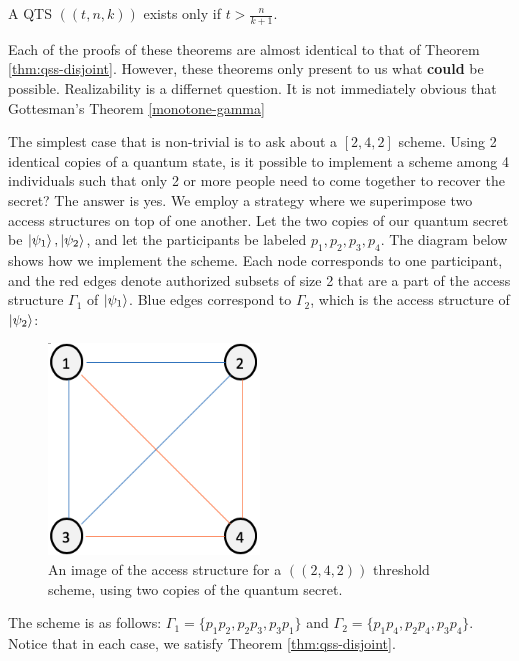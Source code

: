 \begin{theorem}
	\label{qtsk}
	A QTS $((t,n, k))$ exists only if $t > \frac{n}{k+1}$.
\end{theorem}

Each of the proofs of these theorems are almost identical to that of Theorem \ref{thm:qss-disjoint}. However, these theorems only present to us what \textbf{could} be possible. Realizability is a differnet question. It is not immediately obvious that Gottesman's Theorem \ref{monotone-gamma}

The simplest case that is non-trivial is to ask about a $[2,4,2]$ scheme. Using 2 identical copies of a quantum state, is it possible to implement a scheme among 4 individuals such that only 2 or more people need to come together to recover the secret? The answer is yes. We employ a strategy where we superimpose two access structures on top of one another. Let the two copies of our quantum secret be $\ket{\psi_1}, \ket{\psi_2}$, and let the participants be labeled $p_1, p_2, p_3, p_4$. The diagram below shows how we implement the scheme. Each node corresponds to one participant, and the red edges denote authorized subsets of size 2 that are a part of the access structure $\Gamma_1$ of $\ket{\psi_1}$. Blue edges correspond to $\Gamma_2$, which is the access structure of $\ket{\psi_2}$:


\begin{figure}[ht]
	\begin{center}
		\includegraphics[width=0.5\textwidth]{Images/ch3-fig1.png}
	\end{center}
	\caption{An image of the access structure for a $((2,4,2))$ threshold scheme, using two copies of the quantum secret.}
	\label{fig:2-4-2}
\end{figure}


The scheme is as follows: $\Gamma_1 = \{p_1p_2,p_2p_3,p_3p_1\}$ and $\Gamma_2 = \{p_1p_4,p_2p_4,p_3p_4\}$. Notice that in each case, we satisfy Theorem \ref{thm:qss-disjoint}.

